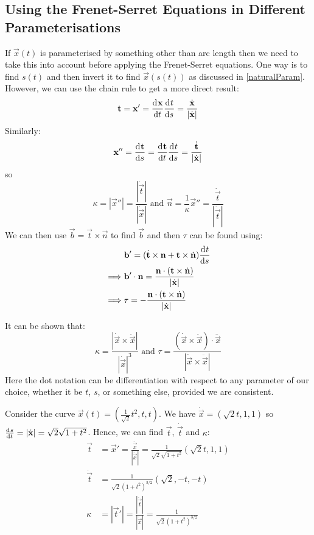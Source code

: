 \documentclass[../main.tex]{subfiles}
\begin{document}
\subsection{Using the Frenet-Serret Equations in Different Parameterisations}
If $\vec{x}(t)$ is parameterised by something other than arc length then we need to take this into account before applying the Frenet-Serret equations.
One way is to find $s(t)$ and then invert it to find $\vec{x}(s(t))$ as discussed in \cref{naturalParam}.
However, we can use the chain rule to get a more direct result:
\[
  \vec{t} = \vec{x}' = \deriv{\vec{x}}{t} \deriv{t}{s} = \frac{\dot{\vec{x}}}{|\dot{\vec{x}}|}
\]
Similarly:
\[
  \vec{x}'' = \deriv{\vec{t}}{s} = \deriv{\vec{t}}{t} \deriv{t}{s} = \frac{\dot{\vec{t}}}{|\dot{\vec{x}}|}
\]
so
\[
  \kappa = |\vec{x}''| = \frac{|\dot{\vec{t}}|}{|\dot{\vec{x}}|} \text{ and } \vec{n} = \frac{1}{\kappa} \vec{x}'' =  \frac{\dot{\vec{t}}}{|\dot{\vec{t}}|}
\]
We can then use $\vec{b} = \vec{t} \times \vec{n}$ to find $\vec{b}$ and then $\tau$ can be found using:
\begin{align*}
  &\vec{b}' = (\dot{\vec{t}} \times \vec{n} + \vec{t} \times \dot{\vec{n}}) \deriv{t}{s} \\
  \implies& \vec{b}' \cdot \vec{n} = \frac{\vec{n} \cdot (\vec{t} \times \dot{\vec{n}})}{|\dot{\vec{x}}|} \\
  \implies& \tau = - \frac{\vec{n} \cdot (\vec{t} \times \dot{\vec{n}})}{|\dot{\vec{x}}|}
\end{align*}
\begin{remark}
  \nonexaminable
  It can be shown that:
  \[
    \kappa = \frac{|\dot{\vec{x}} \times \ddot{\vec{x}}|}{|\dot{\vec{x}}|^3} \text{ and } \tau = \frac{(\dot{\vec{x}} \times \ddot{\vec{x}}) \cdot \dddot{\vec{x}}}{|\dot{\vec{x}} \times \ddot{\vec{x}}|}
  \]
  Here the dot notation can be differentiation with respect to any parameter of our choice, whether it be $t$, $s$, or something else, provided we are consistent.
\end{remark}
\begin{example}
  Consider the curve $\vec{x}(t) = \left(\frac{1}{\sqrt{2}}t^2, t, t\right)$.
  We have $\dot{\vec{x}} = (\sqrt{2}t, 1, 1)$ so $\deriv{s}{t} = |\dot{\vec{x}}| = \sqrt{2}\sqrt{1 + t^2}$.
  Hence, we can find $\vec{t}$, $\dot{\vec{t}}$ and $\kappa$:
  \begin{align*}
    \vec{t} &= \vec{x}' = \frac{\dot{\vec{x}}}{|\dot{\vec{x}}|} = \frac{1}{\sqrt{2}\sqrt{1 + t^2}}(\sqrt{2}t, 1, 1) \\
    \dot{\vec{t}} &= \frac{1}{\sqrt{2}(1 + t^2)^{3/2}} (\sqrt{2}, -t, -t) \\
    \kappa &= |\vec{t}'| = \frac{|\dot{\vec{t}}|}{|\dot{\vec{x}}|} = \frac{1}{\sqrt{2}(1 + t^2)^{3/2}}
  \end{align*}
\end{example}
\end{document}
